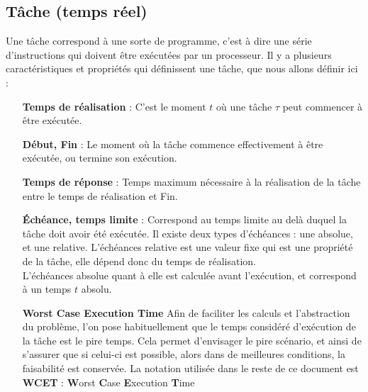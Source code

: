 \documentclass[11pt,a4paper,oneside]{report}
\begin{document}
\subsection{Tâche (temps réel)}
Une tâche correspond à une sorte de programme, c'est à dire une série d'instructions 
qui doivent être exécutées par un processeur. 
Il y a plusieurs caractéristiques 
et propriétés qui définissent une tâche, que nous allons définir ici : 
\begin{itemize}
    \item[\textbf{Temps de réalisation}] : C'est le moment $t$ où une tâche $\tau$ peut commencer à être exécutée.
    \item[\textbf{Début, Fin}] : Le moment où la tâche commence effectivement à être exécutée, ou termine son exécution.
    \item[\textbf{Temps de réponse\label{Response Time}}] : Temps maximum nécessaire à la réalisation de la tâche 
    entre le temps de réalisation et Fin. %
    \item[\textbf{Échéance, temps limite}] : Correspond au temps limite au delà duquel la tâche doit avoir été exécutée. Il existe deux types d'échéances : 
    une absolue, et une relative. L'échéances relative est une valeur fixe qui 
    est une propriété de la tâche, elle dépend donc du temps de réalisation.\\
    L'échéances absolue quant à elle est calculée avant l'exécution, et correspond 
    à un temps $t$ absolu.%
    
    \item[\textbf{Worst Case Execution Time}] Afin de faciliter les calculs et l'abstraction du problème, l'on pose habituellement que le temps considéré d'exécution de 
    la tâche est le pire temps. Cela permet d'envisager le pire scénario, et ainsi 
    de s'assurer que si celui-ci est possible, alors dans de meilleures conditions, 
    la faisabilité est conservée. La notation utilisée dans le reste de ce document 
    est  \textbf{WCET} : \textbf{W}orst \textbf{C}ase \textbf{E}xecution \textbf{T}ime
    

\end{itemize}
\end{document}
